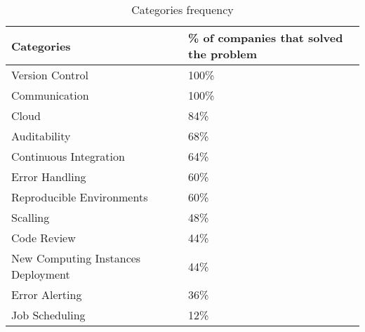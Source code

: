       \begin{table}[h!]
        \begin{center}
            \begin{tabular}{| p{0.5\linewidth} | p{0.5\linewidth} |}
            \hline
            \textbf{Categories} & \textbf{\% of companies that solved the problem} \\ \hline
                  Version Control                       & 100\% \\ \hline
                  Communication                         & 100\% \\ \hline
                  Cloud                                 & 84\%  \\ \hline
                  Auditability                          & 68\%  \\ \hline
                  Continuous Integration                & 64\%  \\ \hline
                  Error Handling                        & 60\%  \\ \hline
                  Reproducible Environments             & 60\%  \\ \hline
                  Scalling                              & 48\%  \\ \hline
                  Code Review                           & 44\%  \\ \hline
                  New Computing Instances Deployment    & 44\%  \\ \hline
                  Error Alerting                        & 36\%  \\ \hline
                  Job Scheduling                        & 12\%  \\ \hline
            \end{tabular}
        \end{center}
        \caption{Categories frequency}
        \label{table:categories}
      \end{table}